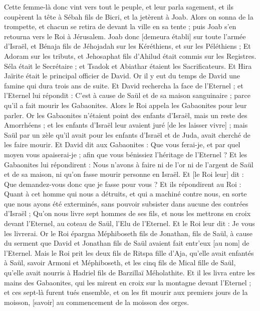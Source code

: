 \begin{multicols}{2}
Cette femme-là donc vint vers tout le peuple, et leur parla sagement, et ils coupèrent la tête à Sébah fils de Bicri, et la jetèrent à Joab. Alors on sonna de la trompette, et chacun se retira de devant la ville en sa tente ; puis Joab s'en retourna vers le Roi à Jérusalem.
Joab donc [demeura établi] sur toute l'armée d'Israël, et Bénaja fils de Jéhojadah sur les Kéréthiens, et sur les Péléthiens ;
Et Adoram sur les tributs, et Jehosaphat fils d'Ahilud était commis sur les Registres.
Séla était le Secrétaire ; et Tsadok et Abiathar étaient les Sacrificateurs.
Et Hira Jaïrite était le principal officier de David.
\VerseOne{}Or il y eut du temps de David une famine qui dura trois ans de suite. Et David rechercha la face de l'Eternel ; et l'Eternel lui répondit : C'est à cause de Saül et de sa maison sanguinaire ; parce qu'il a fait mourir les Gabaonites.
Alors le Roi appela les Gabaonites pour leur parler. Or les Gabaonites n'étaient point des enfants d'Israël, mais un reste des Amorrhéens ; et les enfants d'Israël leur avaient juré [de les laisser vivre] ; mais Saül par un zèle qu'il avait pour les enfants d'Israël et de Juda, avait cherché de les faire mourir.
Et David dit aux Gabaonites : Que vous ferai-je, et par quel moyen vous apaiserai-je ; afin que vous bénissiez l'héritage de l'Eternel ?
Et les Gabaonites lui répondirent : Nous n'avons à faire ni de l'or ni de l'argent de Saül et de sa maison, ni qu'on fasse mourir personne en Israël. Et [le Roi leur] dit : Que demandez-vous donc que je fasse pour vous ?
Et ils répondirent au Roi : Quant à cet homme qui nous a détruits, et qui a machiné contre nous, en sorte que nous ayons été exterminés, sans pouvoir subsister dans aucune des contrées d'Israël ;
Qu'on nous livre sept hommes de ses fils, et nous les mettrons en croix devant l'Eternel, au coteau de Saül, l'Elu de l'Eternel. Et le Roi leur dit : Je vous les livrerai.
Or le Roi épargna Méphiboseth fils de Jonathan, fils de Saül, à cause du serment que David et Jonathan fils de Saül avaient fait entr'eux [au nom] de l'Eternel.
Mais le Roi prit les deux fils de Ritspa fille d'Aja, qu'elle avait enfantés à Saül, savoir Armoni et Méphiboseth, et les cinq fils de Mical fille de Saül, qu'elle avait nourris à Hadriel fils de Barzillaï Méholathite.
Et il les livra entre les mains des Gabaonites, qui les mirent en croix sur la montagne devant l'Eternel ; et ces sept-là furent tués ensemble, et on les fit mourir aux premiers jours de la moisson, [savoir] au commencement de la moisson des orges.

\end{multicols}
